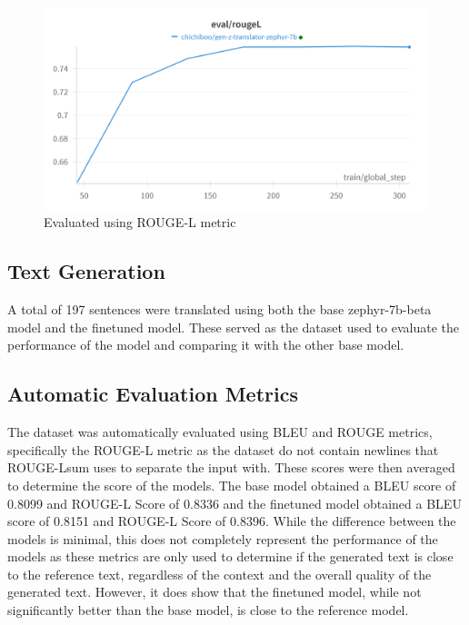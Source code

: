 \begin{figure}[H]
	\centering
	\includegraphics[scale=0.2]{figures/ROUGELEvaluation.png}
	\caption{Evaluated using ROUGE-L metric}
\end{figure}

\subsection{Text Generation}
A total of 197 sentences were translated using both the base zephyr-7b-beta model and the finetuned model. These served as the dataset used to evaluate the performance of the model and comparing it with the other base model.

\subsection{Automatic Evaluation Metrics}
The dataset was automatically evaluated using BLEU and ROUGE metrics, specifically the ROUGE-L metric as the dataset do not contain newlines that ROUGE-Lsum uses to separate the input with. These scores were then averaged to determine the score of the models. The base model obtained a BLEU score of 0.8099 and ROUGE-L Score of 0.8336 and the finetuned model obtained a BLEU score of 0.8151 and ROUGE-L Score of 0.8396. While the difference between the models is minimal, this does not completely represent the performance of the models as these metrics are only used to determine if the generated text is close to the reference text, regardless of the context and the overall quality of the generated text. However, it does show that the finetuned model, while not significantly better than the base model, is close to the reference model.

